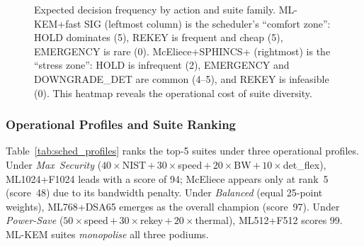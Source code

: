 \begin{figure}[!t]
\centering
{}
\caption{Expected decision frequency by action and suite family.
ML-KEM+fast SIG (leftmost column) is the scheduler's ``comfort
zone'': HOLD dominates (5), REKEY is frequent and cheap (5),
EMERGENCY is rare (0).  McEliece+SPHINCS+ (rightmost) is the
``stress zone'': HOLD is infrequent (2), EMERGENCY and
DOWNGRADE\_DET are common (4--5), and REKEY is infeasible (0).
This heatmap reveals the operational cost of suite diversity.}
\label{fig:sched_freq}
\end{figure}

\subsubsection{Operational Profiles and Suite Ranking}
Table~\ref{tab:sched_profiles} ranks the top-5 suites under three
operational profiles.  Under \emph{Max~Security}
($40{\times}$NIST\,$+$\,$30{\times}$speed\,$+$\,$20{\times}$BW\,$+$\,$10{\times}$det\_flex),
ML1024+F1024 leads with a score of 94; McEliece appears only at
rank~5 (score~48) due to its bandwidth penalty.  Under
\emph{Balanced} (equal 25-point weights), ML768+DSA65 emerges as the
overall champion (score~97).  Under \emph{Power-Save}
($50{\times}$speed\,$+$\,$30{\times}$rekey\,$+$\,$20{\times}$thermal),
ML512+F512 scores 99.  ML-KEM suites \emph{monopolise} all three
podiums.

